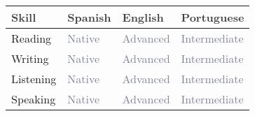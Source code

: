 \documentclass[11pt,a4paper,]{awesome-cv}
\begin{document}
\begin{table}[H]
\centering\begingroup\fontsize{10}{12}\selectfont

\begin{tabular}{>{\centering\arraybackslash}p{4.5cm}>{\centering\arraybackslash}p{4.5cm}>{\centering\arraybackslash}p{4.5cm}>{\centering\arraybackslash}p{4.5cm}}
\toprule
\begingroup\fontsize{12}{14}\selectfont \textcolor[HTML]{414141}{\textbf{Skill}}\endgroup & \begingroup\fontsize{12}{14}\selectfont \textcolor[HTML]{414141}{\textbf{Spanish}}\endgroup & \begingroup\fontsize{12}{14}\selectfont \textcolor[HTML]{414141}{\textbf{English}}\endgroup & \begingroup\fontsize{12}{14}\selectfont \textcolor[HTML]{414141}{\textbf{Portuguese}}\endgroup\\
\midrule
Reading & \textcolor[HTML]{7f7f9f}{Native} & \textcolor[HTML]{7f7f9f}{Advanced} & \textcolor[HTML]{7f7f9f}{Intermediate}\\
Writing & \textcolor[HTML]{7f7f9f}{Native} & \textcolor[HTML]{7f7f9f}{Advanced} & \textcolor[HTML]{7f7f9f}{Intermediate}\\
Listening & \textcolor[HTML]{7f7f9f}{Native} & \textcolor[HTML]{7f7f9f}{Advanced} & \textcolor[HTML]{7f7f9f}{Intermediate}\\
Speaking & \textcolor[HTML]{7f7f9f}{Native} & \textcolor[HTML]{7f7f9f}{Advanced} & \textcolor[HTML]{7f7f9f}{Intermediate}\\
\bottomrule
\end{tabular}
\endgroup{}
\end{table}


\label{LastPage}~
\end{document}
